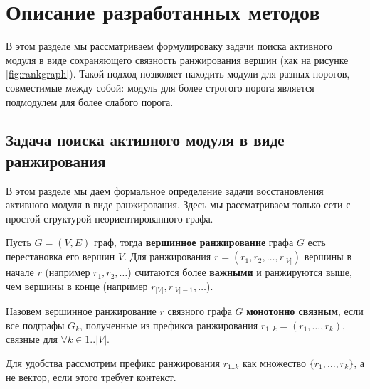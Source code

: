 \chapter{Описание разработанных методов}

В этом разделе мы рассматриваем формулироваку задачи поиска активного 
модуля в виде сохраняющего связность ранжирования вершин (как на рисунке \ref{fig:rankgraph}).
Такой подход позволяет находить модули для разных порогов, 
совместимые между собой: модуль для более строгого порога
является подмодулем для более слабого порога.





\section{Задача поиска активного модуля в виде ранжирования}
\label{sec_formal_defs}

В этом разделе мы даем формальное определение задачи восстановления активного
модуля в виде ранжирования. Здесь мы рассматриваем только сети с простой
структурой неориентированного графа.

\begin{definition}
    Пусть $G = (V, E)$ граф, тогда \textbf{вершинное ранжирование} графа $G$ есть
    перестановка его вершин $V$.  Для ранжирования $r = (r_1, r_2, \ldots,
    r_{|V|})$ вершины в начале $r$ (например $r_1, r_2, \ldots$) считаются
    более \textbf{важными} и ранжируются выше, чем вершины в конце (например
    $r_{|V|}, r_{|V|-1}, \ldots$).
\end{definition}

\begin{definition}
    Назовем вершинное ранжирование $r$ связного графа $G$ \textbf{монотонно
    связным}, если все подграфы $G_k$, полученные из префикса ранжирования
    $r_{1..k} = (r_1, \ldots, r_k)$, связные для $\forall k \in {1..|V|}$.
\end{definition}

Для удобства рассмотрим префикс ранжирования $r_{1..k}$ как множество $\{r_1, \ldots,
r_k\}$, а не вектор, если этого требует контекст.

